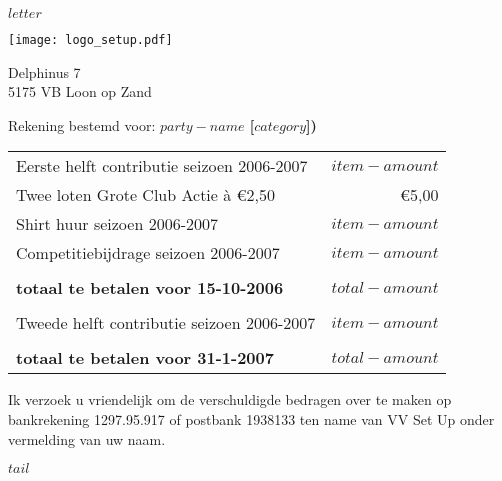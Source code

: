 \documentclass[10pt,streepjes]{brief}
\begin{document}
$letter$
\begin{brief}{}

\texttt{[image: logo\_setup.pdf]}

Delphinus 7 \\
5175 VB  Loon op Zand



\uwbriefvan{}
\uwkenmerk{}


\opening {Rekening bestemd voor: \textbf{$party-name$ [$category$])}}

\begin{tabular}{lr}
Eerste helft contributie seizoen 2006-2007 & $item-amount$ \\
Twee loten Grote Club Actie \`a \euro 2,50 & \euro 5,00 \\
Shirt huur seizoen 2006-2007 & $item-amount$ \\
Competitiebijdrage seizoen 2006-2007 & $item-amount$ \\
 & \\
\textbf{totaal te betalen voor 15-10-2006} & \textbf{$total-amount$}\\
 & \\
Tweede helft contributie seizoen 2006-2007 & $item-amount$ \\
 & \\
\textbf{totaal te betalen voor 31-1-2007} & \textbf{$total-amount$}\\
\end{tabular}

Ik verzoek u vriendelijk om de verschuldigde bedragen over te maken op 
bankrekening 1297.95.917 of postbank 1938133 ten name van VV Set Up onder vermelding van 
uw naam.




\end{brief}
$tail$
\end{document}
